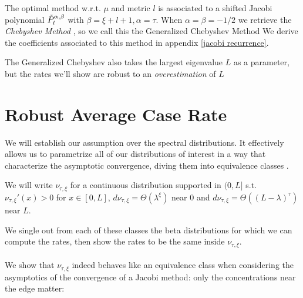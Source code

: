 \documentclass{article}
\begin{document}
The optimal method w.r.t. $\mu$ and metric $l$ is associated to a shifted Jacobi polynomial $\Tilde{P}_t^{\alpha,\beta}$ with $\beta=\xi+l+1, \alpha=\tau$. When $\alpha=\beta=-1/2$ we retrieve the \textit{Chebyshev Method} \cite{hestenes1952methods}, so we call this the Generalized Chebyshev Method
We derive the coefficients associated to this method in appendix \ref{jacobi recurrence}.\\
\begin{remark}
The Generalized Chebyshev also takes the largest eigenvalue $L$ as a parameter, but the rates we'll show are robust to an \textit{overestimation} of $L$
\end{remark}

\section{Robust Average Case Rate}
We will establish our assumption over the spectral distributions. It effectively allows us to parametrize all of our distributions of interest in a way that characterize the asymptotic convergence, diving them into equivalence classes .

\begin{assumption}
We will write $\nu_{\tau,\xi}$ for a continuous distribution supported in $(0,L]$ s.t. $\nu_{\tau,\xi}'(x)>0$ for $x\in [0,L]$, $d\nu_{\tau,\xi}=\Theta( \lambda^\xi)$ near $0$ and $d\nu_{\tau,\xi}=\Theta( (L-\lambda)^\tau)$ near $L$. 
\label{assumption}
\end{assumption}

We single out from each of these classes the beta distributions for which we can compute the rates, then show the rates to be the same inside $\nu_{\tau,\xi}$.\\ 

\paragraph{}
We show that $\nu_{\tau,\xi}$ indeed behaves like an equivalence class when considering the asymptotics of the convergence of a Jacobi method: only the concentrations near the edge matter:
\end{document}
